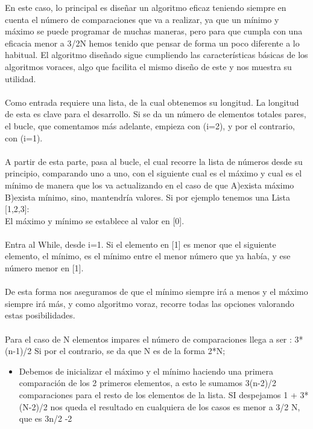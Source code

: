 \documentclass[]{report}
\begin{document}
En este caso, lo principal es diseñar un algoritmo eficaz teniendo siempre en cuenta el número de comparaciones que va a realizar, ya que un mínimo y máximo se puede programar de muchas maneras, pero para que cumpla con una eficacia menor a 3/2N hemos tenido que pensar de forma un poco diferente a lo habitual. El algoritmo diseñado sigue cumpliendo las características básicas de los algoritmos voraces, algo que facilita el mismo diseño de este y nos muestra su utilidad.\\\\
Como entrada requiere una lista, de la cual obtenemos su longitud. La longitud de esta es clave para el desarrollo. Si se da un número de elementos totales pares, el bucle, que comentamos más adelante, empieza con (i=2), y por el contrario, con (i=1).\\\\
A partir de esta parte, pasa al bucle, el cual recorre la lista de números desde su principio, comparando uno a uno, con el siguiente cual es el máximo y cual es el mínimo de manera que los va actualizando en el caso de que A)exista máximo B)exista mínimo, sino, mantendría valores. Si por ejemplo tenemos una Lista [1,2,3]:\\
El máximo y mínimo se establece al valor en [0].\\\\
Entra al While, desde i=1. Si el elemento en [1] es menor que el siguiente elemento, el mínimo, es el mínimo entre el menor número que ya había, y ese número menor en [1].\\\\
De esta forma nos aseguramos de que el mínimo siempre irá a menos y el máximo siempre irá más, y como algoritmo voraz, recorre todas las opciones valorando estas posibilidades.\\\\
Para el caso de N elementos impares el número de comparaciones llega a ser : 3*(n-1)/2  
Si por el contrario, se da que N es de la forma 2*N;\\
\begin{itemize}
	\item Debemos de inicializar el máximo y el mínimo haciendo una primera comparación de los 2 primeros elementos, a esto le sumamos 3(n-2)/2 comparaciones para el resto de los elementos de la lista. SI despejamos 1 + 3*(N-2)/2 nos queda el resultado en cualquiera de los casos es menor a 3/2 N, que es 3n/2 -2
\end{itemize}\newpage
\end{document}
